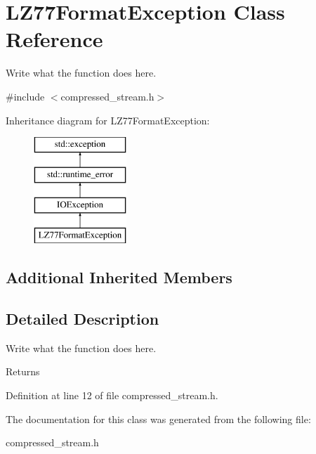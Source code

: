 \hypertarget{classLZ77FormatException}{\section{L\+Z77\+Format\+Exception Class Reference}
\label{classLZ77FormatException}
}


Write what the function does here.  




{\ttfamily \#include $<$compressed\+\_\+stream.\+h$>$}

Inheritance diagram for L\+Z77\+Format\+Exception\+:\begin{figure}[H]
\begin{center}
\leavevmode
\includegraphics[height=4.000000cm]{classLZ77FormatException}
\end{center}
\end{figure}
\subsection*{Additional Inherited Members}


\subsection{Detailed Description}
Write what the function does here. 

\begin{DoxyReturn}{Returns}

\end{DoxyReturn}


Definition at line 12 of file compressed\+\_\+stream.\+h.



The documentation for this class was generated from the following file\+:\begin{DoxyCompactItemize}
\item 
compressed\+\_\+stream.\+h\end{DoxyCompactItemize}

